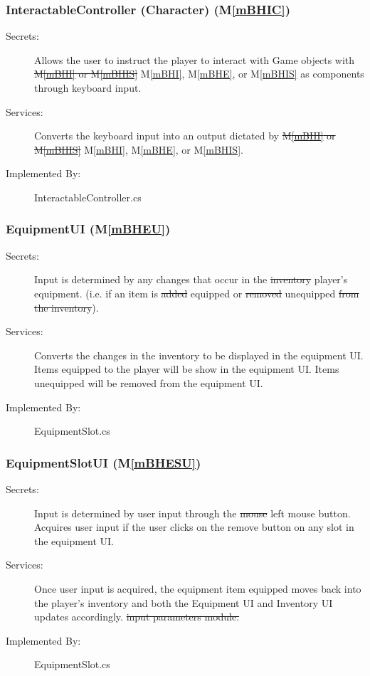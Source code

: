 \documentclass[12pt, titlepage]{article}
\newcommand{\mref}[1]{M\ref{#1}}
\begin{document}
\subsubsection{InteractableController (Character)  (\mref{mBHIC})}

\begin{description}
\item[Secrets:] Allows the user to instruct the player to interact with Game objects with \sout{\mref{mBHI} or \mref{mBHIS}} {\color {magenta}\mref{mBHI}, \mref{mBHE}, or \mref{mBHIS}} as components through keyboard input. 
\item[Services:] Converts the keyboard input into an output dictated by \sout{\mref{mBHI} or \mref{mBHIS}} {\color {magenta}\mref{mBHI}, \mref{mBHE}, or \mref{mBHIS}}.
\item[Implemented By:] InteractableController.cs
\end{description}

\subsubsection{EquipmentUI (\mref{mBHEU})}

\begin{description}
\item[Secrets:] Input is determined by any changes that occur in the \sout{inventory} {\color {magenta}player's equipment.}  (i.e. if an item is \sout{added} {\color {magenta} equipped} or \sout{removed} {\color {magenta} unequipped} \sout{from the inventory}).
\item[Services:] Converts the changes in the inventory to be displayed in the equipment UI. {\color {magenta} Items equipped to the player will be show in the equipment UI. Items unequipped will be removed from the equipment UI.}
\item[Implemented By:] EquipmentSlot.cs
\end{description}

\subsubsection{EquipmentSlotUI (\mref{mBHESU})}

\begin{description}
\item[Secrets:] Input is determined by user input through the \sout{mouse} {\color {magenta} left mouse button}. Acquires user input if the user clicks on the remove button on any slot in the equipment UI. 
\item[Services:] Once user input is acquired, the equipment item equipped moves back into the player's inventory and both the Equipment UI and Inventory UI updates accordingly. 
  \sout{input parameters module.}
\item[Implemented By:] EquipmentSlot.cs
\end{description}
\end{document}
